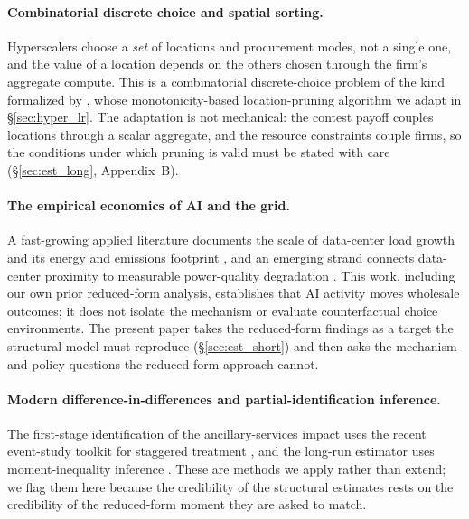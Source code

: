 \documentclass[12pt,letterpaper]{article}
\begin{document}
\paragraph{Combinatorial discrete choice and spatial sorting.} Hyperscalers
choose a \emph{set} of locations and procurement modes, not a single one, and
the value of a location depends on the others chosen through the firm's
aggregate compute. This is a combinatorial discrete-choice problem of the kind
formalized by \citet{arkolakis2023combinatorial}, whose monotonicity-based
location-pruning algorithm we adapt in \S\ref{sec:hyper_lr}. The adaptation is
not mechanical: the contest payoff couples locations through a scalar
aggregate, and the resource constraints couple firms, so the conditions under
which pruning is valid must be stated with care (\S\ref{sec:est_long},
Appendix~B).

\paragraph{The empirical economics of AI and the grid.} A fast-growing applied
literature documents the scale of data-center load growth
\citep{shehabi2024, epri2024, gridstrategies2025} and its energy and emissions
footprint \citep{deVries2023, Thompson2024_AI_Datacenters_Energy_Dynamics}, and
an emerging strand connects data-center proximity to measurable power-quality
degradation \citep{LaughnerEtAl_2024_THDonUSGrid, WhiskerLabs_THD_2024}. This
work, including our own prior reduced-form analysis, establishes that AI
activity moves wholesale outcomes; it does not isolate the mechanism or
evaluate counterfactual choice environments. The present paper takes the
reduced-form findings as a target the structural model must reproduce
(\S\ref{sec:est_short}) and then asks the mechanism and policy questions the
reduced-form approach cannot.

\paragraph{Modern difference-in-differences and partial-identification
inference.} The first-stage identification of the ancillary-services impact
uses the recent event-study toolkit for staggered treatment
\citep{callaway2021difference, borusyak2024revisiting}, and the long-run
estimator uses moment-inequality inference \citep{andrews2010inference}. These
are methods we apply rather than extend; we flag them here because the
credibility of the structural estimates rests on the credibility of the
reduced-form moment they are asked to match.
\end{document}

